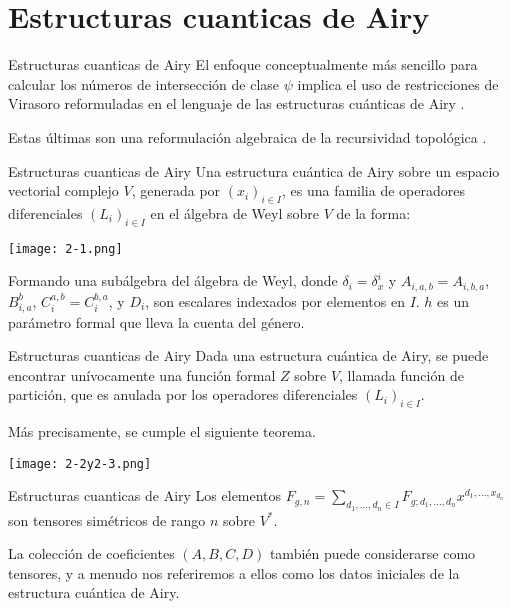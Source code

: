 \documentclass{beamer}
\begin{document}
\section{Estructuras cuanticas de Airy}
\begin{frame}{Estructuras cuanticas de Airy}
    El enfoque conceptualmente más sencillo para calcular los números de intersección de clase $\psi$ implica el uso de restricciones de Virasoro reformuladas en el lenguaje de las estructuras cuánticas de Airy \cite{Kontsevich2017}. 
    \newline
    \pause
    
    Estas últimas son una reformulación algebraica de la recursividad topológica \cite{Eynard2007}. 
\end{frame}

\begin{frame}{Estructuras cuanticas de Airy}
    Una estructura cuántica de Airy sobre un espacio vectorial complejo $V$, generada por $(x_{i})_{i\in I}$, es una familia de operadores diferenciales $(L_{i})_{i\in I}$ en el álgebra de Weyl sobre $V$ de la forma:
    \newline
    
    \texttt{[image: 2-1.png]}
    \newline
    \pause

    Formando una subálgebra del álgebra de Weyl, donde $\delta_{i}=\delta_{x}^{i}$ y $A_{i,a,b} =A_{i,b,a}$, $B^{b}_{i,a}$, $C^{a,b}_{i}=C^{b,a}_{i}$, y $D_{i}$, son escalares indexados por elementos en $I$. $h$ es un parámetro formal que lleva la cuenta del género.
\end{frame}

\begin{frame}{Estructuras cuanticas de Airy}
    Dada una estructura cuántica de Airy, se puede encontrar unívocamente una función formal $Z$ sobre $V$, llamada función de partición, que es anulada por los operadores diferenciales $(L_i)_{i \in I}$. 
    \newline
    \pause
    
    Más precisamente, se cumple el siguiente teorema.
    \newline
    \pause
    
    \texttt{[image: 2-2y2-3.png]}
\end{frame}

\begin{frame}{Estructuras cuanticas de Airy}
    Los elementos $F_{g,n} = \sum_{d_{1},...,d_{n} \in I} F_{g;d_{1},...,d_{n}} x^{d_{1}, ..., x_{d_{n}}}$ son tensores simétricos de rango $n$ sobre $V^{*}$. 
    \newline
    \pause
    
    La colección de coeficientes $(A, B, C, D)$ también puede considerarse como tensores, y a menudo nos referiremos a ellos como los datos iniciales de la estructura cuántica de Airy.
\end{frame}
\end{document}
